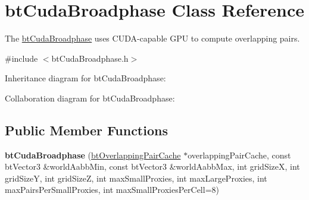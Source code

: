 \hypertarget{classbt_cuda_broadphase}{\section{bt\+Cuda\+Broadphase Class Reference}
\label{classbt_cuda_broadphase}
}


The \hyperlink{classbt_cuda_broadphase}{bt\+Cuda\+Broadphase} uses C\+U\+D\+A-\/capable G\+P\+U to compute overlapping pairs.  




{\ttfamily \#include $<$bt\+Cuda\+Broadphase.\+h$>$}



Inheritance diagram for bt\+Cuda\+Broadphase\+:


Collaboration diagram for bt\+Cuda\+Broadphase\+:
\subsection*{Public Member Functions}
\begin{DoxyCompactItemize}
\item 
\hypertarget{classbt_cuda_broadphase_abda2bdba6d4f3c442581c644487bd698}{{\bfseries bt\+Cuda\+Broadphase} (\hyperlink{classbt_overlapping_pair_cache}{bt\+Overlapping\+Pair\+Cache} $\ast$overlapping\+Pair\+Cache, const bt\+Vector3 \&world\+Aabb\+Min, const bt\+Vector3 \&world\+Aabb\+Max, int grid\+Size\+X, int grid\+Size\+Y, int grid\+Size\+Z, int max\+Small\+Proxies, int max\+Large\+Proxies, int max\+Pairs\+Per\+Small\+Proxies, int max\+Small\+Proxies\+Per\+Cell=8)}\label{classbt_cuda_broadphase_abda2bdba6d4f3c442581c644487bd698}

\end{DoxyCompactItemize}
